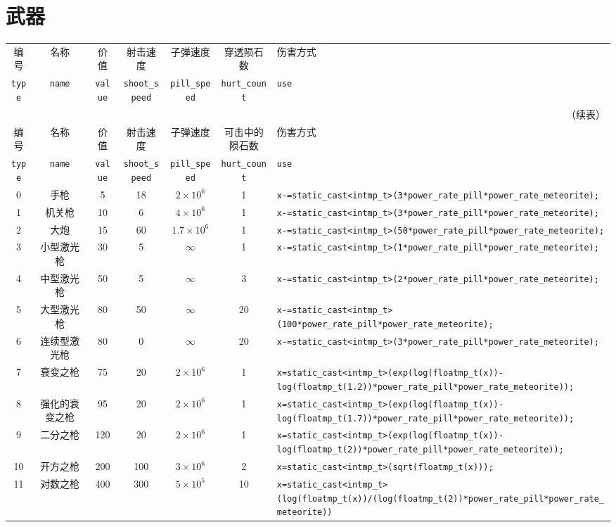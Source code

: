 \documentclass[UTF8,fontset=none,linespread=1.2]{ctexart}
\begin{document}
\section{武器}
\begin{center}
\begin{longtable}{|c|c|c|c|c|c|>{\centering\arraybackslash}m{10cm}|}
\hline
编号&名称&价值&射击速度&子弹速度&穿透陨石数&伤害方式\\
\lstinline|type|&\lstinline|name|&\lstinline|value|&\lstinline|shoot_speed|&\lstinline|pill_speed|&\lstinline|hurt_count|&\lstinline|use|\\\hline
\endfirsthead
\multicolumn{7}{r}{（续表）}\\\hline
编号&名称&价值&射击速度&子弹速度&可击中的陨石数&伤害方式\\
\lstinline|type|&\lstinline|name|&\lstinline|value|&\lstinline|shoot_speed|&\lstinline|pill_speed|&\lstinline|hurt_count|&\lstinline|use|\\\hline
\endhead
0&手枪&5&18&$2\times10^6$&1&\lstinline|x-=static_cast<intmp_t>(3*power_rate_pill*power_rate_meteorite);|\\\hline
1&机关枪&10&6&$4\times10^6$&1&\lstinline|x-=static_cast<intmp_t>(3*power_rate_pill*power_rate_meteorite);|\\\hline
2&大炮&15&60&$1.7\times10^6$&1&\lstinline|x-=static_cast<intmp_t>(50*power_rate_pill*power_rate_meteorite);|\\\hline
3&小型激光枪&30&5&$\infty$&1&\lstinline|x-=static_cast<intmp_t>(1*power_rate_pill*power_rate_meteorite);|\\\hline
4&中型激光枪&50&5&$\infty$&3&\lstinline|x-=static_cast<intmp_t>(2*power_rate_pill*power_rate_meteorite);|\\\hline
5&大型激光枪&80&50&$\infty$&20&\lstinline|x-=static_cast<intmp_t>(100*power_rate_pill*power_rate_meteorite);|\\\hline
6&连续型激光枪&80&0&$\infty$&20&\lstinline|x-=static_cast<intmp_t>(3*power_rate_pill*power_rate_meteorite);|\\\hline
7&衰变之枪&75&20&$2\times10^6$&1&\lstinline|x=static_cast<intmp_t>(exp(log(floatmp_t(x))-log(floatmp_t(1.2))*power_rate_pill*power_rate_meteorite));|\\\hline
8&强化的衰变之枪&95&20&$2\times10^6$&1&\lstinline|x=static_cast<intmp_t>(exp(log(floatmp_t(x))-log(floatmp_t(1.7))*power_rate_pill*power_rate_meteorite));|\\\hline
9&二分之枪&120&20&$2\times10^6$&1&\lstinline|x=static_cast<intmp_t>(exp(log(floatmp_t(x))-log(floatmp_t(2))*power_rate_pill*power_rate_meteorite));|\\\hline
10&开方之枪&200&100&$3\times10^6$&2&\lstinline|x=static_cast<intmp_t>(sqrt(floatmp_t(x)));|\\\hline
11&对数之枪&400&300&$5\times10^5$&10&\lstinline|x=static_cast<intmp_t>(log(floatmp_t(x))/(log(floatmp_t(2))*power_rate_pill*power_rate_meteorite))|\\\hline
\end{longtable}
\end{center}
\end{document}
